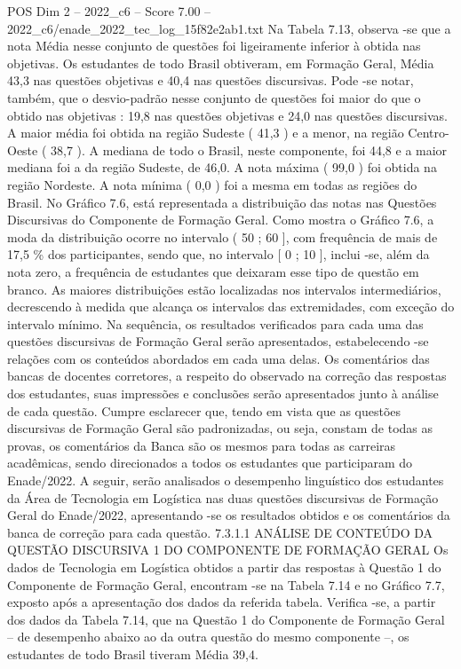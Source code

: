 \begin{textsample}{POS Dim 2 – 2022\_c6 – Score 7.00 – 2022\_c6/enade\_2022\_tec\_log\_15f82e2ab1.txt}
Na Tabela 7.13, observa -se que a nota Média nesse conjunto de questões foi ligeiramente inferior à obtida nas objetivas.
Os estudantes de todo Brasil obtiveram, em Formação Geral, Média 43,3 nas questões objetivas e 40,4 nas questões discursivas.
Pode -se notar, também, que o desvio-padrão nesse conjunto de questões foi maior do que o obtido nas objetivas : 19,8 nas questões objetivas e 24,0 nas questões discursivas.
A maior média foi obtida na região Sudeste ( 41,3 ) e a menor, na região Centro-Oeste ( 38,7 ).
A mediana de todo o Brasil, neste componente, foi 44,8 e a maior mediana foi a da região Sudeste, de 46,0.
A nota máxima ( 99,0 ) foi obtida na região Nordeste.
A nota mínima ( 0,0 ) foi a mesma em todas as regiões do Brasil.
No Gráfico 7.6, está representada a distribuição das notas nas Questões Discursivas do Componente de Formação Geral.
Como mostra o Gráfico 7.6, a moda da distribuição ocorre no intervalo ( 50 ; 60 ], com frequência de mais de 17,5 \% dos participantes, sendo que, no intervalo [ 0 ; 10 ], inclui -se, além da nota zero, a frequência de estudantes que deixaram esse tipo de questão em branco.
As maiores distribuições estão localizadas nos intervalos intermediários, decrescendo à medida que alcança os intervalos das extremidades, com exceção do intervalo mínimo.
Na sequência, os resultados verificados para cada uma das questões discursivas de Formação Geral serão apresentados, estabelecendo -se relações com os conteúdos abordados em cada uma delas.
Os comentários das bancas de docentes corretores, a respeito do observado na correção das respostas dos estudantes, suas impressões e conclusões serão apresentados junto à análise de cada questão.
Cumpre esclarecer que, tendo em vista que as questões discursivas de Formação Geral são padronizadas, ou seja, constam de todas as provas, os comentários da Banca são os mesmos para todas as carreiras acadêmicas, sendo direcionados a todos os estudantes que participaram do Enade/2022.
A seguir, serão analisados o desempenho linguístico dos estudantes da Área de Tecnologia em Logística nas duas questões discursivas de Formação Geral do Enade/2022, apresentando -se os resultados obtidos e os comentários da banca de correção para cada questão. 7.3.1.1 ANÁLISE DE CONTEÚDO DA QUESTÃO DISCURSIVA 1 DO COMPONENTE DE FORMAÇÃO GERAL Os dados de Tecnologia em Logística obtidos a partir das respostas à Questão 1 do Componente de Formação Geral, encontram -se na Tabela 7.14 e no Gráfico 7.7, exposto após a apresentação dos dados da referida tabela.
Verifica -se, a partir dos dados da Tabela 7.14, que na Questão 1 do Componente de Formação Geral – de desempenho abaixo ao da outra questão do mesmo componente –, os estudantes de todo Brasil tiveram Média 39,4.

\end{textsample}

